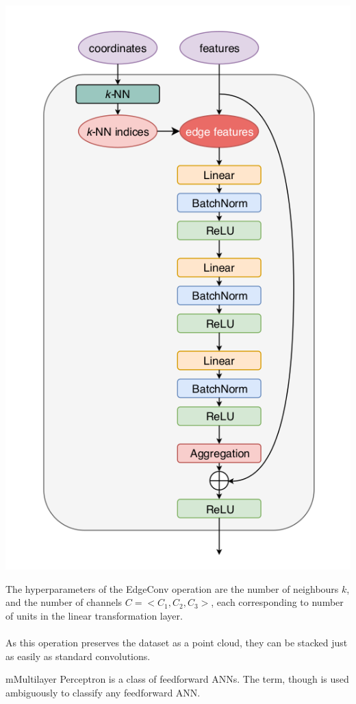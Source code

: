 \begin{center}
    \includegraphics[scale=0.3]{img/edge-conv.png}
\end{center}

\noindent The hyperparameters of the EdgeConv operation are the number of 
neighbours $k$, and the number of channels $C = <C_1,C_2,C_3>$, each 
corresponding to  number of units in the linear transformation layer.
\\\\
As this operation preserves the dataset as a point cloud, they 
can be stacked just as easily as standard convolutions.

\begin{note}
    mMultilayer Perceptron is a class of feedforward ANNs. The term, though is 
    used ambiguously to classify any feedforward ANN.
\end{note}

